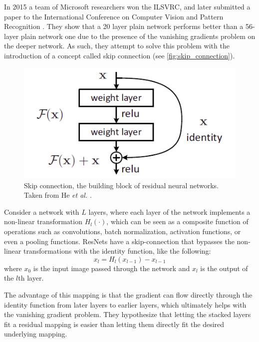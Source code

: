     In 2015 a team of Microsoft researchers won the \ac{ILSVRC}, and later submitted a paper to the International Conference on Computer Vision and Pattern Recognition \cite{resnet}. They show that a 20 layer plain network performs better than a 56-layer plain network one due to the presence of the vanishing gradients problem on the deeper network. As such, they attempt to solve this problem with the introduction of a concept called skip connection (see \autoref{fig:skip_connection}). \par
    \begin{figure}[ht]
      \centering
        \includegraphics[width=0.5\linewidth]{figs/skip_connection.png}
      \caption{Skip connection, the building block of residual neural networks. Taken from He \textit{et al.} \cite{resnet}.}
      \label{fig:skip_connection}
    \end{figure}
    \par
    
    Consider a network with $L$ layers, where each layer of the network implements a non-linear transformation $H_l(\cdot)$, which can be seen as a composite function of operations such as convolutions, batch normalization, activation functions, or even a pooling functions. ResNets have a skip-connection that bypasses the non-linear transformations with the identity function, like the following:
    \begin{equation}
        x_l=H_l(x_{l-1})-x_{l-1}
        \label{eq:residual_mapping}
    \end{equation}
    where $x_0$ is the input image passed through the network and $x_l$ is the output of the $l$th layer.

    The advantage of this mapping is that the gradient can flow directly through the identity function from later layers to earlier layers, which ultimately helps with the vanishing gradient problem. They hypothesize that letting the stacked layers fit a residual mapping is easier than letting them directly fit the desired underlying mapping. \par
    
